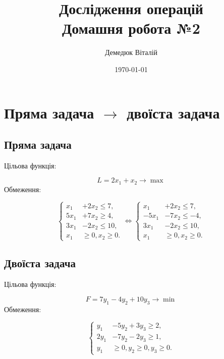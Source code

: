 \documentclass[a4paper, 12pt]{article}
\author{Демедюк Віталій}
\title{Дослідження операцій\\
	   Домашня робота №2}
\date{\today}
\begin{document}
\maketitle
\newpage

\tableofcontents


\newpage

\section{Пряма задача $\rightarrow$ двоїста задача}

\subsection{Пряма задача}

Цільова функція:

\begin{equation*}
L = 2x_1 + x_2 \rightarrow \max
\end{equation*}
Обмеження:

\begin{equation*}
\left\{
\begin{aligned}
	x_1 &+ 2x_2 \leq 7,\\
	5x_1 &+ 7x_2 \geq 4,\\
	3x_1 &- 2x_2 \leq 10,\\
	x_1 &\geq 0, x_2 \geq 0. 
\end{aligned}
\right.
\Longleftrightarrow
\left\{
\begin{aligned}
	x_1 &+ 2x_2 \leq 7,\\
	-5x_1 &- 7x_2 \leq -4,\\
	3x_1 &- 2x_2 \leq 10,\\
	x_1 &\geq 0, x_2 \geq 0. 
\end{aligned}
\right.
\end{equation*}

\subsection{Двоїста задача}

Цільова функція:

\begin{equation*}
F = 7y_1 - 4y_2 + 10y_3 \rightarrow \min
\end{equation*}
Обмеження:

\begin{equation*}
\left\{
\begin{aligned}
	y_1 &- 5y_2 + 3y_3 \geq 2,\\
	2y_1 &- 7y_2 - 2y_3 \geq 1,\\
	y_1 &\geq 0, y_2 \geq 0, y_3 \geq 0. 
\end{aligned}
\right.
\end{equation*}
\end{document}
